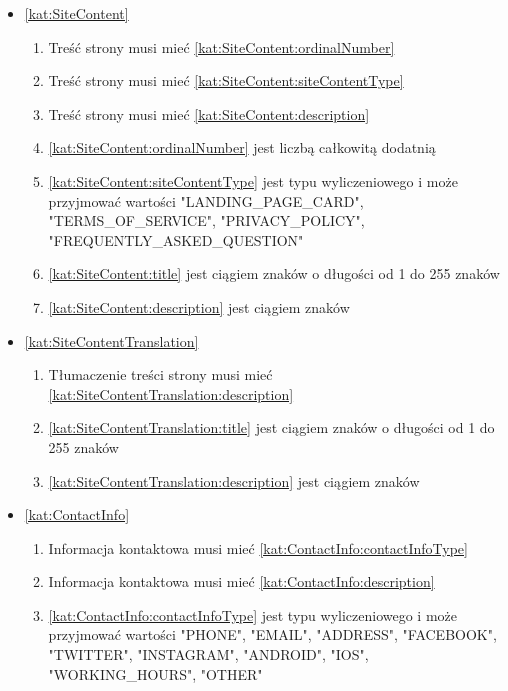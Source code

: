\begin{itemize}[label={\textbf{Ograniczenia dla}}, wide, labelwidth=!, labelindent=0pt]
    \item\ref{kat:SiteContent}
    \begin{enumerate}[label={\textbf{OGR/\protect\threedigits{\arabic{enumi}}}}, wide, labelwidth=!, align=left, leftmargin=3cm, resume]
        \item Treść strony musi mieć \ref{kat:SiteContent:ordinalNumber}
        \item Treść strony musi mieć \ref{kat:SiteContent:siteContentType}
        \item Treść strony musi mieć \ref{kat:SiteContent:description}
        \item \ref{kat:SiteContent:ordinalNumber} jest liczbą całkowitą dodatnią
        \item \ref{kat:SiteContent:siteContentType} jest typu wyliczeniowego i może przyjmować wartości "LANDING\_PAGE\_CARD", "TERMS\_OF\_SERVICE", "PRIVACY\_POLICY", "FREQUENTLY\_ASKED\_QUESTION"
        \item \ref{kat:SiteContent:title} jest ciągiem znaków o długości od 1 do 255 znaków
        \item \ref{kat:SiteContent:description} jest ciągiem znaków
    \end{enumerate}
    \item\ref{kat:SiteContentTranslation}
    \begin{enumerate}[label={\textbf{OGR/\protect\threedigits{\arabic{enumi}}}}, wide, labelwidth=!, align=left, leftmargin=3cm, resume]
        \item Tłumaczenie treści strony musi mieć \ref{kat:SiteContentTranslation:description}
        \item \ref{kat:SiteContentTranslation:title} jest ciągiem znaków o długości od 1 do 255 znaków
        \item \ref{kat:SiteContentTranslation:description} jest ciągiem znaków
    \end{enumerate}
    \item\ref{kat:ContactInfo}
    \begin{enumerate}[label={\textbf{OGR/\protect\threedigits{\arabic{enumi}}}}, wide, labelwidth=!, align=left, leftmargin=3cm, resume]
        \item Informacja kontaktowa musi mieć \ref{kat:ContactInfo:contactInfoType}
        \item Informacja kontaktowa musi mieć \ref{kat:ContactInfo:description}
        \item \ref{kat:ContactInfo:contactInfoType} jest typu wyliczeniowego i może przyjmować wartości "PHONE", "EMAIL", "ADDRESS", "FACEBOOK", "TWITTER", "INSTAGRAM", "ANDROID", "IOS", "WORKING\_HOURS", "OTHER"

\end{enumerate}
\end{itemize}
